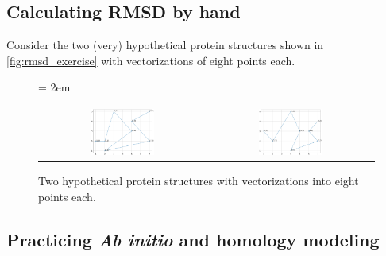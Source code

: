 \subsection{Calculating RMSD by hand}

Consider the two (very) hypothetical protein structures shown in \autoref{fig:rmsd_exercise} with vectorizations of eight points each.\\

\begin{figure}[h]
	\centering
	\mySfFamily
	\tabcolsep = 2em
	\begin{tabular}{c c}
	\includegraphics[width = 0.4\textwidth]{../images/rmsd_exercise1.png} & \includegraphics[width = 0.4\textwidth]{../images/rmsd_exercise2.png}
	\end{tabular}
	\caption{Two hypothetical protein structures with vectorizations into eight points each.}
	\label{fig:rmsd_exercise}
\end{figure}

\begin{exercise}\end{exercise}

\begin{exercise}\end{exercise}

\subsection{Practicing \textit{Ab initio} and homology modeling}


